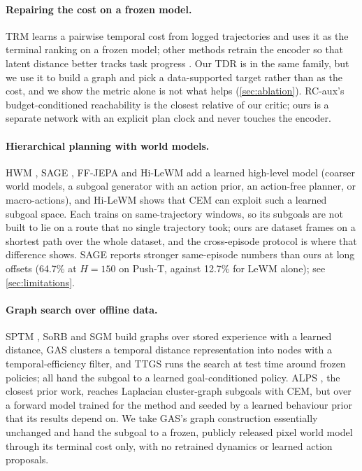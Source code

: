 \documentclass{article} %
\begin{document}
\paragraph{Repairing the cost on a frozen model.}
TRM \citep{trm} learns a pairwise temporal cost from logged trajectories and uses it as the
terminal ranking on a frozen model; other methods retrain the encoder so that latent distance
better tracks task progress \citep{tdjepa,rcaux,dalewm,scale,valueguided,straightening}. Our TDR is
in the same family, but we use it to build a graph and pick a data-supported target rather than as
the cost, and we show the metric alone is not what helps (\cref{sec:ablation}). RC-aux's
budget-conditioned reachability \citep{rcaux} is the closest relative of our critic; ours is a
separate network with an explicit plan clock and never touches the encoder.

\paragraph{Hierarchical planning with world models.}
HWM \citep{hwm}, SAGE \citep{sage}, FF-JEPA \citep{ffjepa} and Hi-LeWM \citep{hilewm} add a learned
high-level model (coarser world models, a subgoal generator with an action prior, an action-free
planner, or macro-actions), and Hi-LeWM shows that CEM can exploit such a learned subgoal space.
Each trains on same-trajectory windows, so its subgoals are not built to lie on a route that no
single trajectory took; ours are dataset frames on a shortest path over the whole dataset, and the
cross-episode protocol is where that difference shows. SAGE reports stronger same-episode numbers
than ours at long offsets (64.7\% at $H\!=\!150$ on Push-T, against 12.7\% for LeWM alone); see
\cref{sec:limitations}.

\paragraph{Graph search over offline data.}
SPTM \citep{sptm}, SoRB \citep{sorb} and SGM \citep{sgm} build graphs over stored experience with a
learned distance, GAS \mbox{\citep{gas}} clusters a temporal distance representation \citep{hilp} into
nodes with a temporal-efficiency filter, and TTGS \citep{ttgs} runs the search at test time around
frozen policies; all hand the subgoal to a learned goal-conditioned policy. ALPS \citep{alps}, the
closest prior work, reaches Laplacian cluster-graph subgoals with CEM, but over a forward model
trained for the method and seeded by a learned behaviour prior that its results depend on. We take
GAS's graph construction essentially unchanged and hand the subgoal to a frozen, publicly released
pixel world model through its terminal cost only, with no retrained dynamics or learned action
proposals.
\end{document}
